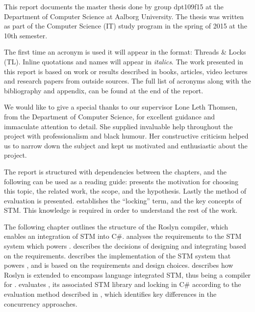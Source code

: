 \makeatletter {}\makeatother
{}
This report documents the master thesis done by group dpt109f15 at the Department of Computer Science at Aalborg University. The thesis was written as part of the Computer Science (IT) study program in the spring of 2015 at the 10th semester.

The first time an acronym is used it will appear in the format: Threads \& Locks (TL). Inline quotations and names will appear in \textit{italics}. The work presented in this report is based on work or results described in books, articles, video lectures and research papers from outside sources. The full list of acronyms along with the bibliography and appendix, can be found at the end of the report.

We would like to give a special thanks to our supervisor Lone Leth Thomsen, from the Department of Computer Science, for excellent guidance and immaculate attention to detail. She supplied invaluable help throughout the project with professionalism and black humour. Her constructive criticism helped us to narrow down the subject and kept us motivated and enthusiastic about the project.

The report is structured with dependencies between the chapters, and the following can be used as a reading guide:  presents the motivation for choosing this topic, the related work, the scope, and the hypothesis. Lastly the method of evaluation is presented.  establishes the ``locking'' term, and the key concepts of \ac{STM}. This knowledge is required in order to understand the rest of the work. 

The following chapter  outlines the structure of the Roslyn compiler, which enables an integration of \ac{STM} into C\#.  analyses the requirements to the \ac{STM} system which powers \stmname.  describes the decisions of designing and integrating \stmname based on the requirements.  describes the implementation of the \ac{STM} system that powers \stmname, and is based on the requirements and design choices.  describes how Roslyn is extended to encompass language integrated \ac{STM}, thus being a compiler for \stmname.  evaluates \stmname, its associated \ac{STM} library and locking in C\# according to the evaluation method described in , which identifies key differences in the concurrency approaches. 

